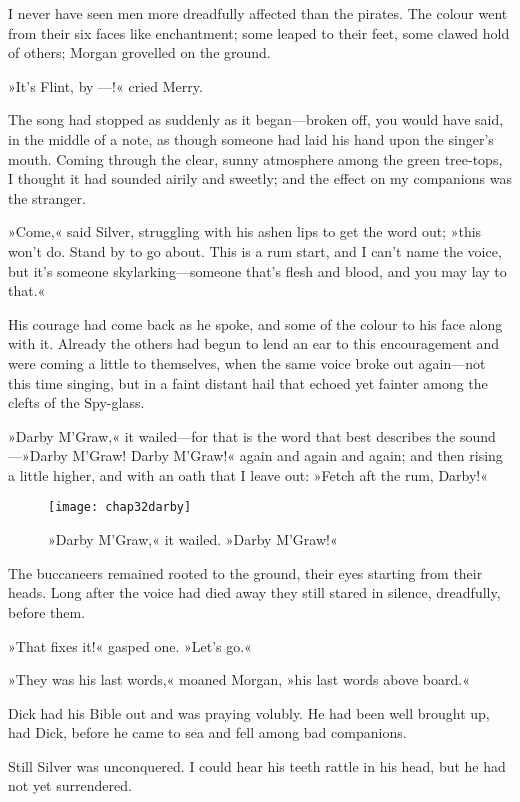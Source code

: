 I never have seen men more dreadfully affected than the pirates. The colour went from their six faces like enchantment; some leaped to their feet, some clawed hold of others; Morgan grovelled on the ground.

»It's Flint, by —!« cried Merry.

The song had stopped as suddenly as it began—broken off, you would have said, in the middle of a note, as though someone had laid his hand upon the singer's mouth. Coming through the clear, sunny atmosphere among the green tree-tops, I thought it had sounded airily and sweetly; and the effect on my companions was the stranger.

»Come,« said Silver, struggling with his ashen lips to get the word out; »this won't do. Stand by to go about. This is a rum start, and I can't name the voice, but it's someone skylarking—someone that's flesh and blood, and you may lay to that.«

His courage had come back as he spoke, and some of the colour to his face along with it. Already the others had begun to lend an ear to this encouragement and were coming a little to themselves, when the same voice broke out again—not this time singing, but in a faint distant hail that echoed yet fainter among the clefts of the Spy-glass.

»Darby M'Graw,« it wailed—for that is the word that best describes the sound—»Darby M'Graw! Darby M'Graw!« again and again and again; and then rising a little higher, and with an oath that I leave out: »Fetch aft the rum, Darby!«

 \begin{figure}[p]
\centering
\texttt{[image: chap32darby]}
\caption{»Darby M'Graw,« it wailed. »Darby M'Graw!«}
\end{figure}  

The buccaneers remained rooted to the ground, their eyes starting from their heads. Long after the voice had died away they still stared in silence, dreadfully, before them.

»That fixes it!« gasped one. »Let's go.«

»They was his last words,« moaned Morgan, »his last words above board.«

Dick had his Bible out and was praying volubly. He had been well brought up, had Dick, before he came to sea and fell among bad companions.

Still Silver was unconquered. I could hear his teeth rattle in his head, but he had not yet surrendered.

